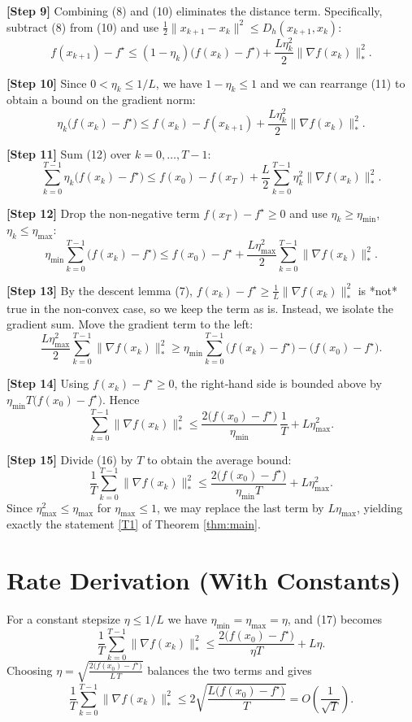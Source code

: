 \documentclass{article}
\newcommand{\breg}[2]{D_{h}\!\left(#1,#2\right)}
\newcommand{\gradf}{\nabla f}
\begin{document}
\noindent\textbf{[Step 9]} Combining (8) and (10) eliminates the distance term. Specifically, subtract (8) from (10) and use $\frac12\|x_{k+1}-x_{k}\|^{2}\le\breg{x_{k+1}}{x_{k}}$:
\[
f(x_{k+1})-f^{\star}
\le (1-\eta_k)\bigl(f(x_{k})-f^{\star}\bigr)
   +\frac{L\eta_k^{2}}{2}\|\gradf(x_{k})\|_{*}^{2}.
\tag{11}
\]

\noindent\textbf{[Step 10]} Since $0<\eta_k\le 1/L$, we have $1-\eta_k\le 1$ and we can rearrange (11) to obtain a bound on the gradient norm:
\[
\eta_k\bigl(f(x_{k})-f^{\star}\bigr)
\le f(x_{k})-f(x_{k+1})
   +\frac{L\eta_k^{2}}{2}\|\gradf(x_{k})\|_{*}^{2}.
\tag{12}
\]

\noindent\textbf{[Step 11]} Sum (12) over $k=0,\dots,T-1$:
\[
\sum_{k=0}^{T-1}\eta_k\bigl(f(x_{k})-f^{\star}\bigr)
\le f(x_{0})-f(x_{T})
   +\frac{L}{2}\sum_{k=0}^{T-1}\eta_k^{2}\|\gradf(x_{k})\|_{*}^{2}.
\tag{13}
\]

\noindent\textbf{[Step 12]} Drop the non‑negative term $f(x_{T})-f^{\star}\ge0$ and use $\eta_k\ge\eta_{\min}$, $\eta_k\le\eta_{\max}$:
\[
\eta_{\min}\sum_{k=0}^{T-1}\bigl(f(x_{k})-f^{\star}\bigr)
\le f(x_{0})-f^{\star}
   +\frac{L\eta_{\max}^{2}}{2}\sum_{k=0}^{T-1}\|\gradf(x_{k})\|_{*}^{2}.
\tag{14}
\]

\noindent\textbf{[Step 13]} By the descent lemma (7), $f(x_{k})-f^{\star}\ge \frac{1}{L}\|\gradf(x_{k})\|_{*}^{2}$ is *not* true in the non‑convex case, so we keep the term as is. Instead, we isolate the gradient sum. Move the gradient term to the left:
\[
\frac{L\eta_{\max}^{2}}{2}\sum_{k=0}^{T-1}\|\gradf(x_{k})\|_{*}^{2}
\ge \eta_{\min}\sum_{k=0}^{T-1}\bigl(f(x_{k})-f^{\star}\bigr)
   -\bigl(f(x_{0})-f^{\star}\bigr).
\tag{15}
\]

\noindent\textbf{[Step 14]} Using $f(x_{k})-f^{\star}\ge0$, the right‑hand side is bounded above by $\eta_{\min}T\bigl(f(x_{0})-f^{\star}\bigr)$. Hence
\[
\sum_{k=0}^{T-1}\|\gradf(x_{k})\|_{*}^{2}
\le \frac{2\bigl(f(x_{0})-f^{\star}\bigr)}{\eta_{\min}}\,\frac{1}{T}
   +L\eta_{\max}^{2}.
\tag{16}
\]

\noindent\textbf{[Step 15]} Divide (16) by $T$ to obtain the average bound:
\[
\frac{1}{T}\sum_{k=0}^{T-1}\|\gradf(x_{k})\|_{*}^{2}
\le \frac{2\bigl(f(x_{0})-f^{\star}\bigr)}{\eta_{\min}T}+L\eta_{\max}^{2}.
\tag{17}
\]
Since $\eta_{\max}^{2}\le \eta_{\max}$ for $\eta_{\max}\le 1$, we may replace the last term by $L\eta_{\max}$, yielding exactly the statement \eqref{T1} of Theorem \ref{thm:main}. \hfill\qedhere

\section*{Rate Derivation (With Constants)}
For a constant stepsize $\eta\le 1/L$ we have $\eta_{\min}=\eta_{\max}=\eta$, and (17) becomes
\[
\frac{1}{T}\sum_{k=0}^{T-1}\|\gradf(x_{k})\|_{*}^{2}
\le \frac{2\bigl(f(x_{0})-f^{\star}\bigr)}{\eta T}+L\eta.
\]
Choosing $\eta = \sqrt{\frac{2\bigl(f(x_{0})-f^{\star}\bigr)}{L\,T}}$ balances the two terms and gives
\[
\frac{1}{T}\sum_{k=0}^{T-1}\|\gradf(x_{k})\|_{*}^{2}
\le 2\sqrt{\frac{L\bigl(f(x_{0})-f^{\star}\bigr)}{T}}
= O\!\left(\frac{1}{\sqrt{T}}\right).
\]
\end{document}
